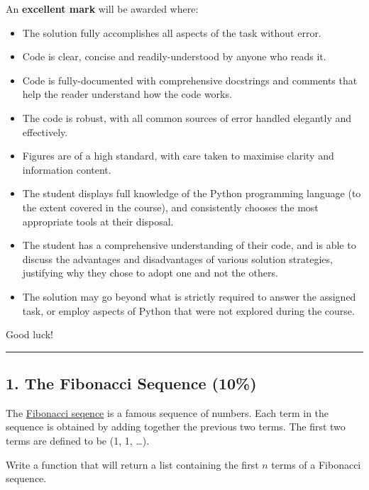 \documentclass[11pt]{article}
\begin{document}
An \textbf{excellent mark} will be awarded where:

\begin{itemize}
\item
  The solution fully accomplishes all aspects of the task without error.
\item
  Code is clear, concise and readily-understood by anyone who reads it.
\item
  Code is fully-documented with comprehensive docstrings and comments
  that help the reader understand how the code works.
\item
  The code is robust, with all common sources of error handled elegantly
  and effectively.
\item
  Figures are of a high standard, with care taken to maximise clarity
  and information content.
\item
  The student displays full knowledge of the Python programming language
  (to the extent covered in the course), and consistently chooses the
  most appropriate tools at their disposal.
\item
  The student has a comprehensive understanding of their code, and is
  able to discuss the advantages and disadvantages of various solution
  strategies, justifying why they chose to adopt one and not the others.
\item
  The solution may go beyond what is strictly required to answer the
  assigned task, or employ aspects of Python that were not explored
  during the course.
\end{itemize}

Good luck!

\begin{center}\rule{0.5\linewidth}{\linethickness}\end{center}

    \hypertarget{the-fibonacci-sequence-10}{%
\subsection*{1. The Fibonacci Sequence
(10\%)}\label{the-fibonacci-sequence-10}}

The \href{https://en.wikipedia.org/wiki/Fibonacci_number}{Fibonacci
seqence} is a famous sequence of numbers. Each term in the sequence is
obtained by adding together the previous two terms. The first two terms
are defined to be (1, 1, \ldots{}).

Write a function that will return a list containing the first \(n\)
terms of a Fibonacci sequence.
\end{document}
